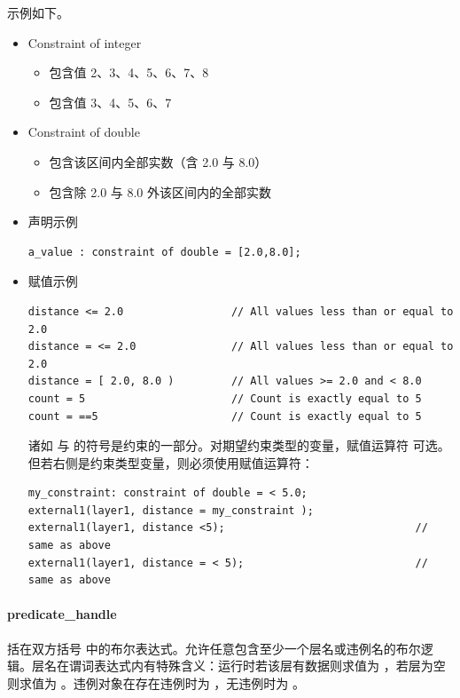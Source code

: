 示例如下。
\begin{itemize}
  \item Constraint of integer
  \begin{itemize}
    \item \cmd{[2,8]} 包含值 2、3、4、5、6、7、8
    \item {} 包含值 3、4、5、6、7
  \end{itemize}
  \item Constraint of double
  \begin{itemize}
    \item \cmd{[2,8]} 包含该区间内全部实数（含 2.0 与 8.0）
    \item {} 包含除 2.0 与 8.0 外该区间内的全部实数
  \end{itemize}
  \item 声明示例
\begin{lstlisting}[style=pxl]
a_value : constraint of double = [2.0,8.0];
\end{lstlisting}
  \item 赋值示例
\begin{lstlisting}[style=pxl]
distance <= 2.0                 // All values less than or equal to 2.0
distance = <= 2.0               // All values less than or equal to 2.0
distance = [ 2.0, 8.0 )         // All values >= 2.0 and < 8.0
count = 5                       // Count is exactly equal to 5
count = ==5                     // Count is exactly equal to 5
\end{lstlisting}
\begin{noteBox}
诸如 \cmd{==} 与 \cmd{<=} 的符号是约束的一部分。对期望约束类型的变量，赋值运算符 \cmd{=} 可选。但若右侧是约束类型变量，则必须使用赋值运算符：
\end{noteBox}
\begin{lstlisting}[style=pxl]
my_constraint: constraint of double = < 5.0;
external1(layer1, distance = my_constraint );
external1(layer1, distance <5);                              // same as above
external1(layer1, distance = < 5);                           // same as above
\end{lstlisting}
\end{itemize}

\paragraph{predicate\_handle}

括在双方括号 \cmd{[[\ldots]]} 中的布尔表达式。允许任意包含至少一个层名或违例名的布尔逻辑。层名在谓词表达式内有特殊含义：运行时若该层有数据则求值为 ，若层为空则求值为 。违例对象在存在违例时为 ，无违例时为 。

